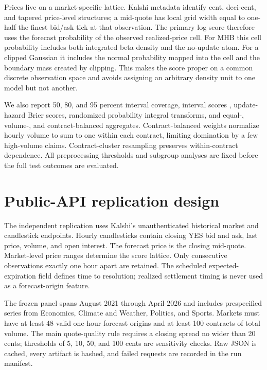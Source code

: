 \documentclass[11pt]{article}
\newcommand{\1}{\mathbb I}
\begin{document}
Prices live on a market-specific lattice. Kalshi metadata identify cent,
deci-cent, and tapered price-level structures; a mid-quote has local grid width
equal to one-half the finest bid/ask tick at that observation. The primary log
score therefore uses the forecast probability of the observed realized-price
cell. For MHB this cell
probability includes both integrated beta density and the no-update atom. For a
clipped Gaussian it includes the normal probability mapped into the cell and
the boundary mass created by clipping. This makes the score proper on a common
discrete observation space and avoids assigning an arbitrary density unit to
one model but not another.

We also report 50, 80, and 95 percent interval coverage, interval scores
\citep{winkler1972decision,gneiting2007strictly}, update-hazard Brier scores,
randomized probability integral transforms, and equal-, volume-, and
contract-balanced aggregates. Contract-balanced weights normalize hourly volume
to sum to one within each contract, limiting domination by a few high-volume
claims. Contract-cluster resampling preserves within-contract dependence.
All preprocessing thresholds and subgroup analyses are fixed before the full
test outcomes are evaluated.

\section{Public-API replication design}

The independent replication uses Kalshi's unauthenticated historical market
and candlestick endpoints. Hourly candlesticks contain closing YES bid and ask,
last price, volume, and open interest. The forecast price is the closing
mid-quote. Market-level price ranges determine the score lattice. Only
consecutive observations exactly one hour apart are retained.
The scheduled expected-expiration field defines time to resolution; realized
settlement timing is never used as a forecast-origin feature.

The frozen panel spans August 2021 through April 2026 and includes prespecified
series from Economics, Climate and Weather, Politics, and Sports. Markets must
have at least 48 valid one-hour forecast origins and at least 100 contracts of total volume. The
main quote-quality rule requires a closing spread no wider than 20 cents;
thresholds of 5, 10, 50, and 100 cents are sensitivity checks. Raw JSON is
cached, every artifact is hashed, and failed requests are recorded in the run
manifest.
\end{document}
